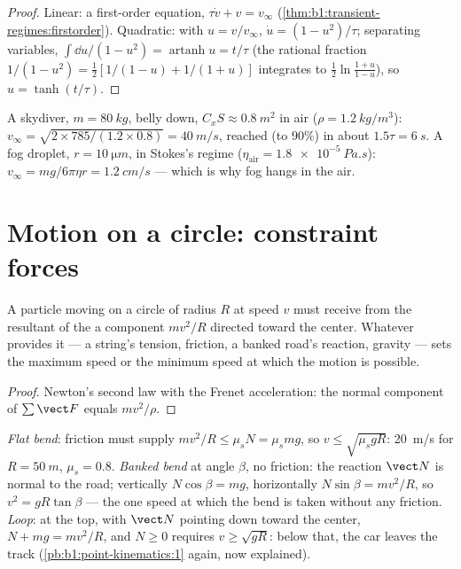 \begin{proof}
Linear: a first-order equation, $\tau\dot v + v = v_\infty$
(\cref{thm:b1:transient-regimes:firstorder}). Quadratic: with
$u = v/v_\infty$, $\dot u = (1 - u^2)/\tau$; separating variables,
$\int\dd u/(1 - u^2) = \operatorname{artanh}u = t/\tau$ (the rational
fraction $1/(1 - u^2) = \tfrac12[1/(1 - u) + 1/(1 + u)]$ integrates to
$\tfrac12\ln\frac{1 + u}{1 - u}$), so $u = \tanh(t/\tau)$.
\end{proof}

\begin{example}\label{ex:b1:newton-dynamics:terminal}
A skydiver, $m = \qty{80}{kg}$, belly down, $C_xS \approx \qty{0.8}{m^2}$
in air ($\rho = \qty{1.2}{kg/m^3}$): $v_\infty = \sqrt{2 \times 785/(1.2
\times 0.8)} = \qty{40}{m/s}$, reached (to $90\%$) in about $1.5\tau =
\qty{6}{s}$. A fog droplet, $r = \qty{10}{\micro m}$, in Stokes's regime
($\eta_{\text{air}} = \qty{1.8e-5}{Pa.s}$): $v_\infty = mg/6\pi\eta r =
\qty{1.2}{cm/s}$ --- which is why fog hangs in the air.
\end{example}

\section{Motion on a circle: constraint forces}

\begin{proposition}\label{prop:b1:newton-dynamics:centripetal}
A particle moving on a circle of radius $R$ at speed $v$ must receive
from the resultant of the  a component $mv^2/R$ directed toward
the center. Whatever provides it --- a string's tension, friction, a
banked road's reaction, gravity --- sets the maximum speed or the
minimum speed at which the motion is possible.
\end{proposition}

\begin{proof}
Newton's second law with the Frenet acceleration: the normal component
of $\sum\vect F$ equals $mv^2/\rho$.
\end{proof}

\begin{example}\label{ex:b1:newton-dynamics:circles}
\emph{Flat bend}: friction must supply $mv^2/R \leq \mu_sN = \mu_smg$,
so $v \leq \sqrt{\mu_sgR}$: \qty{20}{m/s} for $R = \qty{50}{m}$,
$\mu_s = 0.8$. \emph{Banked bend} at angle $\beta$, no friction: the
reaction $\vect N$ is normal to the road; vertically $N\cos\beta = mg$,
horizontally $N\sin\beta = mv^2/R$, so $v^2 = gR\tan\beta$ --- the one
speed at which the bend is taken without any friction. \emph{Loop}: at
the top, with $\vect N$ pointing down toward the center, $N + mg =
mv^2/R$, and $N \geq 0$ requires $v \geq \sqrt{gR}$: below that, the car
leaves the track (\cref{pb:b1:point-kinematics:1} again, now explained).
\end{example}

